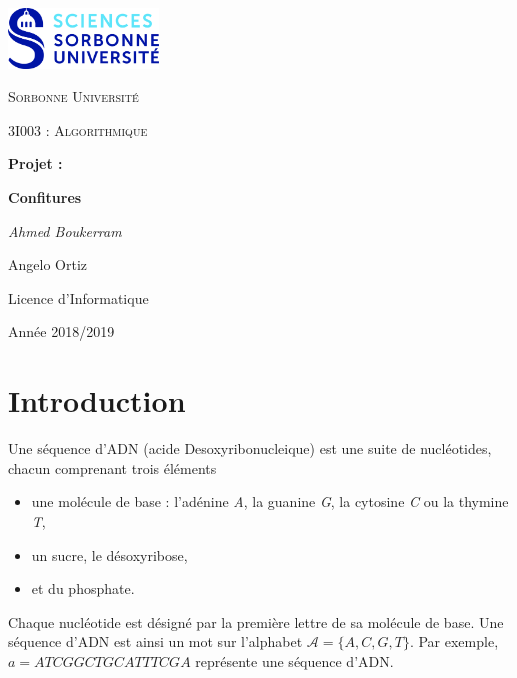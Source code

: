 \documentclass[12pt,a4paper]{article}
\begin{document}
\begin{titlepage}
	\centering
	\includegraphics[width=0.30\textwidth]{logo.jpg}\par\vspace{1cm}
	{\scshape\LARGE Sorbonne Universit\'e \par}
	\vspace{1cm}
	{\scshape\Large 3I003 : Algorithmique\par}
	\vspace{1.5cm}
	{\Large \bfseries Projet :\par}
	{\huge\bfseries Confitures\par}
	\vspace{2cm}
	{\Large\itshape Ahmed Boukerram \par Angelo Ortiz\par}
	
	\vfill

	{\large Licence d'Informatique\par}
	{\large Ann\'ee 2018/2019\par}
\end{titlepage}




\tableofcontents

\newpage

\section{Introduction}

Une s\'equence d'ADN (acide Desoxyribonucleique) est une suite de nucl\'eotides, chacun comprenant trois \'el\'ements
\begin{itemize}
	\item une mol\'ecule de base : l'ad\'enine {\itshape A}, la guanine {\itshape G}, la cytosine {\itshape C} ou la thymine {\itshape T},
	\item un sucre, le d\'esoxyribose,
	\item et du phosphate.
\end{itemize}
Chaque nucl\'eotide est d\'esign\'e par la premi\`ere lettre de sa mol\'ecule de base. Une s\'equence d'ADN est ainsi un mot sur l'alphabet \( \mathcal{A} = \{A, C, G, T\} \). Par exemple, \( a = ATCGGCTGCATTTCGA \) repr\'esente une s\'equence d'ADN.
\end{document}
